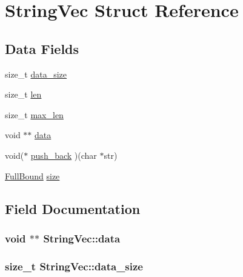 \hypertarget{struct_string_vec}{}\section{String\+Vec Struct Reference}
\label{struct_string_vec}
\subsection*{Data Fields}
\begin{DoxyCompactItemize}
\item 
size\+\_\+t \hyperlink{struct_string_vec_a505092c0cc63a215ddc950726453196e}{data\+\_\+size}
\item 
size\+\_\+t \hyperlink{struct_string_vec_a1dc740add1d3783ed79b118f3b115e7e}{len}
\item 
size\+\_\+t \hyperlink{struct_string_vec_acd88f36d6487fb52ec7fac1e2a3699fc}{max\+\_\+len}
\item 
void $\ast$$\ast$ \hyperlink{struct_string_vec_a0ef48f702209e994978bb9bb6c13291c}{data}
\item 
void($\ast$ \hyperlink{struct_string_vec_af05c9a2ae87afdb54531240ca7ff125d}{push\+\_\+back} )(char $\ast$str)
\item 
\hyperlink{bind_8h_a7c87cc0eb01b046c5adc0fb1d6fcd62c}{Full\+Bound} \hyperlink{struct_string_vec_ae4ae32f5a45935a1d362357d264b6c2c}{size}
\end{DoxyCompactItemize}


\subsection{Field Documentation}
\subsubsection[{\texorpdfstring{data}{data}}]{\setlength{\rightskip}{0pt plus 5cm}void $\ast$$\ast$ String\+Vec\+::data}\hypertarget{struct_string_vec_a0ef48f702209e994978bb9bb6c13291c}{}\label{struct_string_vec_a0ef48f702209e994978bb9bb6c13291c}
\subsubsection[{\texorpdfstring{data\+\_\+size}{data_size}}]{\setlength{\rightskip}{0pt plus 5cm}size\+\_\+t String\+Vec\+::data\+\_\+size}\hypertarget{struct_string_vec_a505092c0cc63a215ddc950726453196e}{}\label{struct_string_vec_a505092c0cc63a215ddc950726453196e}
